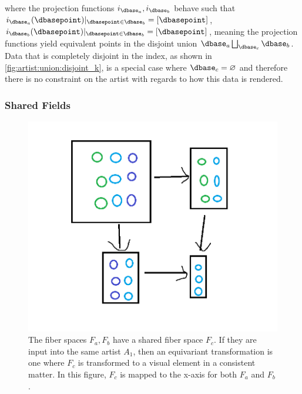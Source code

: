 \documentclass[10pt,journal,compsoc]{IEEEtran}
\theoremstyle{definition}
\theoremstyle{remark}
\begin{document}
where the projection functions $i_{\dbase_a},i_{\dbase_b}$ behave such that $i_{\dbase_a}(\dbasepoint)\vert_{\dbasepoint \in \dbase_b} = \left[\dbasepoint\right]$, $i_{\dbase_b}(\dbasepoint)\vert_{\dbasepoint \in \dbase_b} = \left[\dbasepoint\right]$, meaning the projection functions yield equivalent points in the disjoint union $\dbase_a \bigsqcup_{\dbase_c} \dbase_b$. Data that is completely disjoint in the index, as shown in \autoref{fig:artist:union:disjoint_k}, is a special case where $\dbase_c=\varnothing$ and therefore there is no constraint on the artist with regards to how this data is rendered. 

\subsubsection{Shared Fields}

\begin{figure}[h!]
  \includegraphics[width=\columnwidth]{intersection_f.png}
  \caption{The fiber spaces $F_a, F_b$ have a shared fiber space $F_c$. If they are input into the same artist $A_1$, then an equivariant transformation is one where $F_c$ is transformed to a visual element in a consistent matter. In this figure, $F_c$ is mapped to the x-axis for both $F_a$ and $F_b$.}
  \label{fig:artist:compose:union_fiber}
\end{figure}
\end{document}
